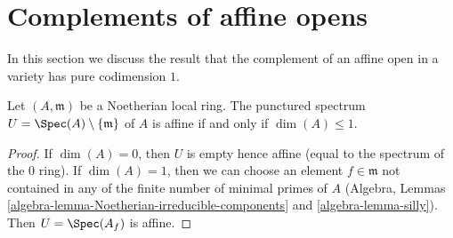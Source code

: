 \section{Complements of affine opens}
\label{section-complement-affine-open}

\noindent
In this section we discuss the result that the complement of an
affine open in a variety has pure codimension $1$.

\begin{lemma}
\label{lemma-affine-punctured-spec}
Let $(A, \mathfrak m)$ be a Noetherian local ring.
The punctured spectrum $U = \Spec(A) \setminus \{\mathfrak m\}$
of $A$ is affine if and only if $\dim(A) \leq 1$.
\end{lemma}

\begin{proof}
If $\dim(A) = 0$, then $U$ is empty hence affine (equal to the spectrum of
the $0$ ring). If $\dim(A) = 1$, then we can choose an element
$f \in \mathfrak m$ not contained in any of the finite number of minimal
primes of $A$
(Algebra, Lemmas \ref{algebra-lemma-Noetherian-irreducible-components} and
\ref{algebra-lemma-silly}). Then $U = \Spec(A_f)$
is affine.


\end{proof}
